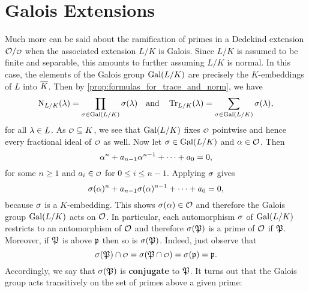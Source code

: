   \section{Galois Extensions}
    Much more can be said about the ramification of primes in a Dedekind extension $\mc{O}/\smc{O}$ when the associated extension $L/K$ is Galois. Since $L/K$ is assumed to be finite and separable, this amounts to further assuming $L/K$ is normal. In this case, the elements of the Galois group $\operatorname{\mathrm{Gal}}(L/K)$ are precisely the $K$-embeddings of $L$ into $\overline{K}$. Then by \cref{prop:formulas_for_trace_and_norm}, we have
    \[
      \operatorname{\mathrm{N}}_{L/K}(\lambda) = \prod_{\sigma \in \operatorname{\mathrm{Gal}}(L/K)}\sigma(\lambda) \quad \text{and} \quad \operatorname{\mathrm{Tr}}_{L/K}(\lambda) = \sum_{\sigma \in \operatorname{\mathrm{Gal}}(L/K)}\sigma(\lambda),
    \]
    for all $\lambda \in L$. As $\smc{O} \subseteq K$, we see that $\operatorname{\mathrm{Gal}}(L/K)$ fixes $\smc{O}$ pointwise and hence every fractional ideal of $\smc{O}$ as well. Now let $\sigma \in \operatorname{\mathrm{Gal}}(L/K)$ and $\alpha \in \mathcal{O}$. Then
    \[
      \alpha^{n}+a_{n-1}\alpha^{n-1}+\cdots+a_{0} = 0,
    \]
    for some $n \ge 1$ and $a_{i} \in \smc{O}$ for $0 \le i \le n-1$. Applying $\sigma$ gives
     \[
      \sigma(\alpha)^{n}+a_{n-1}\sigma(\alpha)^{n-1}+\cdots+a_{0} = 0,
    \]
    because $\sigma$ is a $K$-embedding. This shows $\sigma(\alpha) \in \mathcal{O}$ and therefore the Galois group $\operatorname{\mathrm{Gal}}(L/K)$ acts on $\mathcal{O}$. In particular, each automorphism $\sigma$ of $\operatorname{\mathrm{Gal}}(L/K)$ restricts to an automorphism of $\mathcal{O}$ and therefore $\sigma(\mathfrak{P})$ is a prime of $\mathcal{O}$ if $\mathfrak{P}$. Moreover, if $\mathfrak{P}$ is above $\mathfrak{p}$ then so is $\sigma(\mathfrak{P})$. Indeed, just observe that
    \[
      \s(\mf{P}) \cap \smc{O} = \s(\mf{P} \cap \smc{O}) = \s(\mf{p}) = \mf{p}.
    \]
    Accordingly, we say that $\sigma(\mathfrak{P})$ is \textbf{conjugate} to $\mathfrak{P}$. It turns out that the Galois group acts transitively on the set of primes above a given prime:

